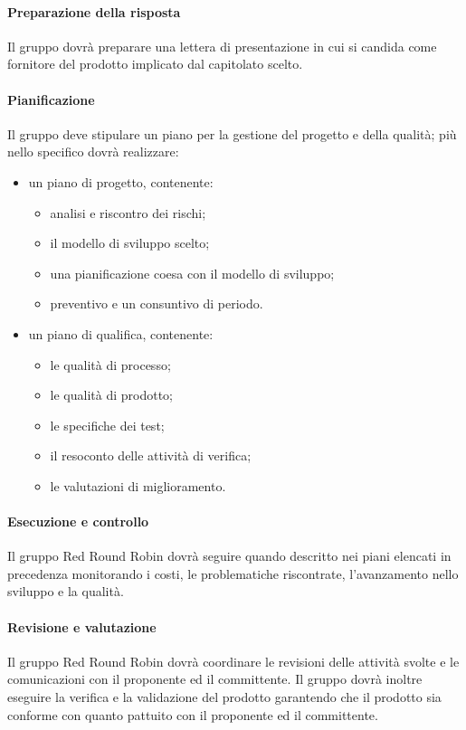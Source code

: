 		\paragraph{Preparazione della risposta}
			Il gruppo dovrà preparare una lettera di presentazione in cui si candida come fornitore del prodotto implicato dal capitolato scelto.
		\paragraph{Pianificazione}
			Il gruppo deve stipulare un piano per la gestione del progetto e della qualità; più nello specifico dovrà realizzare:
			\begin{itemize}
				\item un piano di progetto, contenente:
				\begin{itemize}
				 	\item analisi e riscontro dei rischi;
				 	\item il modello di sviluppo scelto;
				 	\item una pianificazione coesa con il modello di sviluppo;
				 	\item preventivo e un consuntivo di periodo.
				 \end{itemize} 
				\item un piano di qualifica, contenente: 
				\begin{itemize}
					\item le qualità di processo;
					\item le qualità di prodotto;
					\item le specifiche dei test;
					\item il resoconto delle attività di verifica;
					\item le valutazioni di miglioramento.
				\end{itemize}
			\end{itemize}
			
		\paragraph{Esecuzione e controllo}
			Il gruppo Red Round Robin dovrà seguire quando descritto nei piani elencati in precedenza monitorando i costi, le problematiche riscontrate, l'avanzamento nello sviluppo e la qualità.
		\paragraph{Revisione e valutazione}
			Il gruppo Red Round Robin dovrà coordinare le revisioni delle attività svolte e le comunicazioni con il proponente ed il committente. Il gruppo dovrà inoltre eseguire la verifica e la validazione del prodotto garantendo che il prodotto sia conforme con quanto pattuito con il proponente ed il committente.
